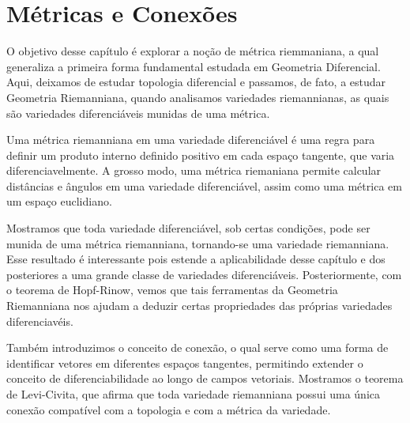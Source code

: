 
\chapter{Métricas e Conexões}
\label{cap:metricas-conexoes}
O objetivo desse capítulo é explorar a noção de métrica riemmaniana, a qual generaliza a primeira forma fundamental estudada em Geometria Diferencial. Aqui, deixamos de estudar topologia diferencial e passamos, de fato, a estudar Geometria Riemanniana, quando analisamos variedades riemannianas, as quais são variedades diferenciáveis munidas de uma métrica.

Uma métrica riemanniana em uma variedade diferenciável é uma regra para definir um produto interno definido positivo em cada espaço tangente, que varia diferenciavelmente. A grosso modo, uma métrica riemaniana permite calcular distâncias e ângulos em uma variedade diferenciável, assim como uma métrica em um espaço euclidiano.

Mostramos que toda variedade diferenciável, sob certas condições, pode ser munida de uma métrica riemanniana, tornando-se uma variedade riemanniana. Esse resultado é interessante pois estende a aplicabilidade desse capítulo e dos posteriores a uma grande classe de variedades diferenciáveis. Posteriormente, com o teorema de Hopf-Rinow, vemos que tais ferramentas da Geometria Riemanniana nos ajudam a deduzir certas propriedades das próprias variedades diferenciavéis.

Também introduzimos o conceito de conexão, o qual serve como uma forma de identificar vetores em diferentes espaços tangentes, permitindo extender o conceito de diferenciabilidade ao longo de campos vetoriais. Mostramos o teorema de Levi-Civita, que afirma que toda variedade riemanniana possui uma única conexão compatível com a topologia e com a métrica da variedade.
